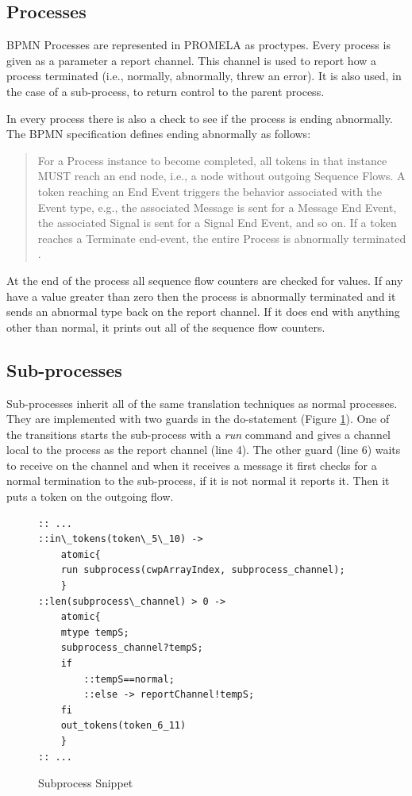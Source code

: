 \documentclass[11pt,twocolumn]{article}
\begin{document}
\subsection{Processes}
BPMN Processes are represented in PROMELA as proctypes. Every process is given as a parameter a report channel. This channel is used to report how a process terminated (i.e., normally, abnormally, threw an error). It is also used, in the case of a sub-process, to return control to the parent process.

In every process there is also a check to see if the process is ending abnormally. The BPMN specification defines ending abnormally as follows:
\begin{quote}
For a Process instance to become completed, all tokens in that instance MUST reach an end node, i.e., a node without
outgoing Sequence Flows. A token reaching an End Event triggers the behavior associated with the Event type, e.g.,
the associated Message is sent for a Message End Event, the associated Signal is sent for a Signal End Event, and
so on. If a token reaches a Terminate end-event, the entire Process is abnormally terminated \cite{BPMNSpecification}.
\end{quote}

At the end of the process all sequence flow counters are checked for values. If any have a value greater than zero then the process is abnormally terminated and it sends an abnormal type back on the report channel. If it does end with anything other than normal, it prints out all of the sequence flow counters.

\subsection{Sub-processes}

Sub-processes inherit all of the same translation techniques as normal processes. They are implemented with two guards in the do-statement (Figure \ref{fig:subprocessSnippet}). One of the transitions starts the sub-process with a \emph{run} command and gives a channel local to the process as the report channel (line 4). The other guard (line 6) waits to receive on the channel and when it receives a message it first checks for a normal termination to the sub-process, if it is not normal it reports it. Then it puts a token on the outgoing flow.

\begin{figure}
\begin{lstlisting}
:: ...
::in\_tokens(token\_5\_10) -> 
	atomic{
	run subprocess(cwpArrayIndex, subprocess_channel); 
	}
::len(subprocess\_channel) > 0 ->
	atomic{
	mtype tempS;
	subprocess_channel?tempS;
	if
		::tempS==normal;
		::else -> reportChannel!tempS;
	fi
	out_tokens(token_6_11)
	}	
:: ...
\end{lstlisting}

\caption{Subprocess Snippet}
 \label{fig:subprocessSnippet}
\end{figure}
\end{document}
